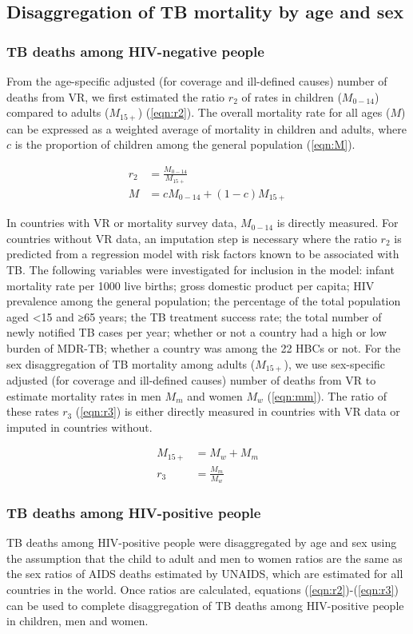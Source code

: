 \subsection{Disaggregation of TB mortality by age and sex}

\subsubsection{TB deaths among HIV-negative people}

From the age-specific adjusted (for coverage and ill-defined causes) number of deaths from VR, we first estimated the ratio $r_2$ of rates in children ($M_{0-14}$) compared to adults ($M_{15+}$) (\ref{eqn:r2}). The overall mortality rate for all ages ($M$) can be expressed as a weighted average of mortality in children and adults, where $c$ is the proportion of children among the general population (\ref{eqn:M}).


\begin{align}
r_2 &= \frac{M_{0-14}}{M_{15+}} \label{eqn:r2} \\
M &= c M_{0-14} + (1 - c) M_{15+} \label{eqn:M}
\end{align}


In countries with VR or mortality survey data, $M_{0-14}$ is directly measured. For countries without VR data, an imputation step is necessary where the ratio $r_2$ is predicted from a regression model with risk factors known to be associated with TB. The following variables were investigated for inclusion in the model: infant mortality rate per 1000 live births; gross domestic product per capita; HIV prevalence among the general population; the percentage of the total population aged <15 and ≥65 years; the TB treatment suc­cess rate; the total number of newly notified TB cases per year; whether or not a country had a high or low burden of MDR-TB; whether a country was among the 22 HBCs or not. For the sex disaggregation of TB mortality among adults ($M_{15+}$), we use sex-specific adjusted (for coverage and ill-defined causes) number of deaths from VR to estimate mortality rates in men $M_m$  and women $M_w$ (\ref{eqn:mm}). The ratio of these rates $r_3$ (\ref{eqn:r3}) is either directly measured in countries with VR data or imputed in countries without.


\begin{align}
M_{15+} &= M_w + M_m \label{eqn:mm} \\
r_3 &= \frac{M_m}{M_w} \label{eqn:r3}
\end{align}



\subsubsection{TB deaths among HIV-positive people}

TB deaths among HIV-positive people were disaggregated by age and sex using the assumption that the child to adult and men to women ratios are the same as the sex ratios of AIDS deaths estimated by UNAIDS, which are estimated for all countries in the world. Once ratios are calculated, equations (\ref{eqn:r2})-(\ref{eqn:r3}) can be used to complete disaggregation of TB deaths among HIV-positive people in children, men and women.
